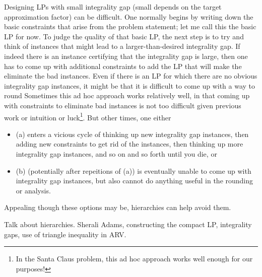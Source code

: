 Designing LPs with small integrality gap (small depends on the target approximation factor) can be difficult. 
One normally begins by writing down the basic constraints that arise from the problem statement; let me call this the basic LP for now. 
To judge the quality of that basic LP, the next step is to try and think of instances that might lead to a larger-than-desired integrality gap.
If indeed there is an instance certifying that the integrality gap is large, then one has to come up 
with additional constraints to add the LP that will make the eliminate the bad instances. 
Even if there is an LP for which there are no obvious integrality gap instances, it might be that 
it is difficult to come up with a way to round  
Sometimes this ad hoc approach works relatively well, in that coming up with constraints to eliminate bad instances 
is not too difficult given previous work or intuition or luck\footnote{In the Santa Claus problem, this ad hoc approach works well enough for our purposes!}.
But other times, one either 
\begin{itemize}
\item(a) enters a vicious cycle of thinking up new integrality gap instances, then adding new constraints to get rid of the instances, 
then thinking up more integrality gap instances, and so on and so forth until you die, or
\item(b) (potentially after repeitions of (a)) is eventually unable to come up with integrality gap instances, 
but also cannot do anything useful in the rounding or analysis. 
\end{itemize}
Appealing though these options may be, hierarchies can help avoid them. 



Talk about hierarchies. Sherali Adams, constructing the compact LP, integrality gaps, use of triangle inequality in ARV.


